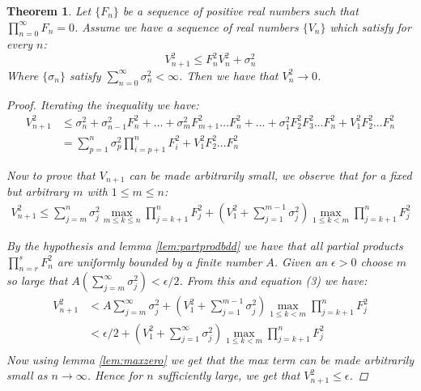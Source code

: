 \documentclass{article}
\newtheorem{theorem}{Theorem}
\begin{document}
    \begin{theorem}\label{thm:recle}
        Let $\{F_n\}$ be a sequence of positive real numbers such that $\prod_{n=0}^\infty F_n =0$. Assume we have a sequence of real numbers $\{V_n\}$ which satisfy for every $n$:
        \[ 
            V_{n+1}^2 \le F_n^2 V_n^2 + \sigma_n^2
        \]
        Where $\{\sigma_n\}$ satisfy $\sum_{n=0}^\infty \sigma_n^2 < \infty$. Then we have that $V_n^2 \rightarrow 0$.
        \begin{proof}
        Iterating the inequality we have:
        \begin{align}
            V_{n+1}^2 &\le  \sigma_n^2 + \sigma_{n-1}^2 F_n^2 + \dots + \sigma_{m}^2 F_{m+1}^2\dots F_n^2 +\dots+ \sigma_{1}^2 F_{2}^2 F_3^2\dots F_n^2 + V_1^2 F_2^2\dots F_n^2 \\
            &=  \sum_{p=1}^n \sigma_p^2 \prod_{i=p+1}^n F_i^2 + V_1^2 F_2^2\dots F_n^2
        \end{align}
        
        Now to prove that $V_{n+1}$ can be made arbitrarily small, we observe that for a fixed but arbitrary $m$ with $1\le m \le n$:
        \begin{align}
            V_{n+1}^2 \le \sum_{j=m}^n \sigma_j^2 \max_{m \le k \le n} \prod_{j=k+1}^n F_j^2 + \left(V_1^2 + \sum_{j=1}^{m-1} \sigma_j^2\right)\max_{1 \le k < m}\prod_{j=k+1}^n F_j^2
        \end{align}
        
        By the hypothesis and lemma \ref{lem:partprodbdd} we have that all partial products $\prod_{n=r}^s F_n^2$ are uniformly bounded by a finite number $A$.
        Given an $\epsilon >0$ choose $m$ so large that $A (\sum_{j=m}^\infty \sigma_j^2) < \epsilon/2$. 
        From this and equation (3) we have: 
        \begin{align}
             V_{n+1}^2 &< A \sum_{j=m}^\infty \sigma_j^2  + \left(V_1^2 + \sum_{j=1}^{m-1} \sigma_j^2\right)\max_{1 \le k < m}\prod_{j=k+1}^n F_j^2 \\
             &< \epsilon/2 + \left(V_1^2 + \sum_{j=1}^\infty \sigma_j^2\right)\max_{1 \le k < m}\prod_{j=k+1}^n F_j^2 \\
        \end{align}
        Now using lemma \ref{lem:maxzero} we get that the max term can be made arbitrarily small as $n \rightarrow \infty$. Hence for $n$ sufficiently large, we get that $V_{n+1}^2 \le \epsilon$.
        \end{proof}
        
        
        \end{theorem}
        
\end{document}
